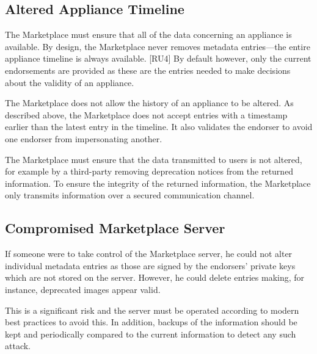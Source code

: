 \subsection{Altered Appliance Timeline}

The Marketplace must ensure that all of the data concerning an
appliance is available.  By design, the Marketplace never removes
metadata entries---the entire appliance timeline is always
available. [RU4] By default however, only the current endorsements are
provided as these are the entries needed to make decisions about the
validity of an appliance.

The Marketplace does not allow the history of an appliance to be
altered.  As described above, the Marketplace does not accept entries
with a timestamp earlier than the latest entry in the timeline.  It
also validates the endorser to avoid one endorser from impersonating
another.

The Marketplace must ensure that the data transmitted to users is not
altered, for example by a third-party removing deprecation notices
from the returned information.  To ensure the integrity of the
returned information, the Marketplace only transmits information over
a secured communication channel.

\subsection{Compromised Marketplace Server}

If someone were to take control of the Marketplace server, he could
not alter individual metadata entries as those are signed by the
endorsers' private keys which are not stored on the server.  However, he
could delete entries making, for instance, deprecated images appear
valid.

This is a significant risk and the server must be operated according
to modern best practices to avoid this.  In addition, backups of the
information should be kept and periodically compared to the current
information to detect any such attack.

